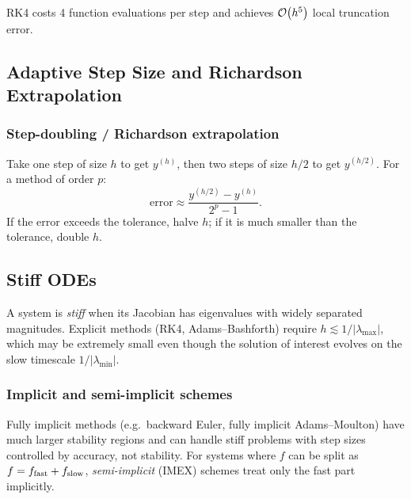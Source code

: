RK4 costs 4 function evaluations per step and achieves
$\mathcal{O}\!\left(h^5\right)$ local truncation error.

\subsection{Adaptive Step Size and Richardson Extrapolation}
\label{subsec:lec12:adaptive}

\subsubsection*{Step-doubling / Richardson extrapolation}
Take one step of size $h$ to get $y^{(h)}$, then two steps of size
$h/2$ to get $y^{(h/2)}$.  For a method of order $p$:
\begin{equation}
  \text{error} \approx \frac{y^{(h/2)}-y^{(h)}}{2^p - 1}.
  \label{eq:lec12:rich}
\end{equation}
If the error exceeds the tolerance, halve $h$; if it is much smaller
than the tolerance, double $h$.

\subsection{Stiff ODEs}\label{subsec:lec12:stiff}

A system is \emph{stiff} when its Jacobian has eigenvalues with widely
separated magnitudes.  Explicit methods (RK4, Adams–Bashforth) require
$h \lesssim 1/|\lambda_{\max}|$, which may be extremely small even though
the solution of interest evolves on the slow timescale $1/|\lambda_{\min}|$.

\subsubsection*{Implicit and semi-implicit schemes}
Fully implicit methods (e.g.\ backward Euler, fully implicit
Adams–Moulton) have much larger stability regions and can handle
stiff problems with step sizes controlled by accuracy, not stability.
For systems where $f$ can be split as $f = f_{\rm fast} + f_{\rm slow}$,
\emph{semi-implicit} (IMEX) schemes treat only the fast part implicitly.

